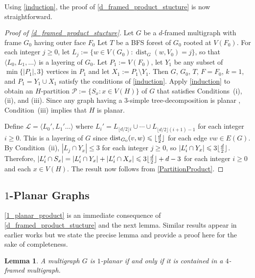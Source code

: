 \documentclass{patmorin}
\theoremstyle{plain}
\newtheorem{lem}[thm]{Lemma}
\theoremstyle{definition}
\DeclareMathOperator{\dist}{dist}
\DeclarePairedDelimiter{\floor}{\lfloor}{\rfloor}
\renewcommand{\ge}{\geqslant}
\renewcommand{\le}{\leqslant}
\begin{document}
Using \cref{induction}, the proof of \cref{d_framed_product_stucture} is now straightforward.

\begin{proof}[Proof of \cref{d_framed_product_stucture}]
Let $G$ be a $d$-framed multigraph with frame $G_0$ having outer face $F_0$
Let $T$ be a BFS forest of $G_0$ rooted at $V(F_0)$.  For each integer $j\ge 0$, let $L_j:=\{w\in V(G_0):\dist_G(w,V_0)=j\}$, so that $\langle L_0,L_1,\ldots\rangle$ is a layering of $G_0$.  Let $P_1:= V(F_0)$, let $Y_1$ be any subset of $\min\{|P_1|,3\}$ vertices in $P_1$ and let $X_1:=P_1\setminus Y_1$.  Then $G$, $G_0$, $T$, $F=F_0$, $k=1$, and $P_1=Y_1\cup X_1$ satisfy the conditions of \cref{induction}.  Apply \cref{induction} to obtain an $H$-partition $\mathcal{P}:=\{S_x:x\in V(H)\}$ of $G$ that satisfies Conditions~(i), (ii), and (iii).  Since any graph having a $3$-simple tree-decomposition is planar \cite{knauer.ueckerdt:simple,kratochvil.vaner:note,elmallah.colbourn:on}, Condition~(iii) implies that $H$ is planar.

Define $\mathcal{L}=\langle L_0',L_1'\ldots\rangle$ where $L_i'=L_{\lfloor d/2\rfloor i}\cup \cdots \cup L_{\lfloor d/2\rfloor(i+1)-1}$ for each integer $i\ge 0$. This is a layering of $G$ since $\dist_{G_0}(v,w)\le \floor{ \frac{d}{2} }$ for each edge $vw\in E(G)$.  By Condition~(ii), $|L_j\cap Y_x|\le 3$ for each integer $j\ge 0$, so $|L_i'\cap Y_x|\le 3\floor{\tfrac{d}{2}}$. Therefore, $|L_i'\cap S_x|= |L_i'\cap Y_x|+ |L_i'\cap X_x|\le 3\floor{ \tfrac{d}{2}} + d -3$ for each integer $i\ge 0$ and each $x\in V(H)$. The result now follows from \cref{PartitionProduct}.
\end{proof}


\subsection{\boldmath $1$-Planar Graphs}
\label{sec-1-planar}


\cref{1_planar_product} is an immediate consequence of \cref{d_framed_product_stucture} and the next lemma. Similar results appear in earlier works \cite{CGP06,BDGGMR,Brandenburg19,Brandenburg20} but we state the precise lemma and provide a proof here for the sake of completeness.

\begin{lem}\label{1_planar_is_4_framed}
A multigraph $G$ is $1$-planar if and only if it is contained in a $4$-framed multigraph.
\end{lem}
\end{document}
